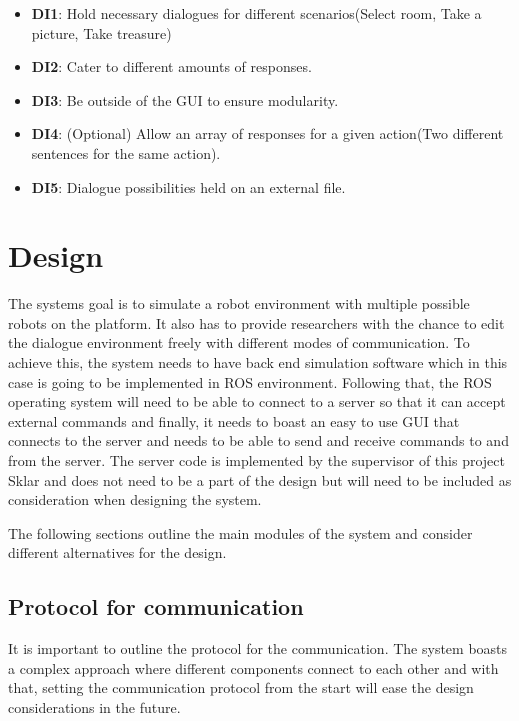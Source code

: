 \documentclass{report}
\begin{document}
        \begin{itemize}
          \item \textbf{DI1}: Hold necessary dialogues for different scenarios(Select room, Take a picture, Take treasure)
          \item \textbf{DI2}: Cater to different amounts of responses.
          \item \textbf{DI3}: Be outside of the GUI to ensure modularity.
          \item \textbf{DI4}: (Optional) Allow an array of responses for a given action(Two different sentences for the same action).
          \item \textbf{DI5}: Dialogue possibilities held on an external file.
        \end{itemize}

  \chapter{Design}

    The systems goal is to simulate a robot environment with multiple possible robots on the platform. It also has to provide researchers with the chance to edit the dialogue environment freely with different modes of communication. To achieve this, the system needs to have back end simulation software which in this case is going to be implemented in ROS environment. Following that, the ROS operating system will need to be able to connect to a server so that it can accept external commands and finally, it needs to boast an easy to use GUI that connects to the server and needs to be able to send and receive commands to and from the server. The server code is implemented by the supervisor of this project Sklar and does not need to be a part of the design but will need to be included as consideration when designing the system.

    The following sections outline the main modules of the system and consider different alternatives for the design.
    \section{Protocol for communication}
      It is important to outline the protocol for the communication. The system boasts a complex approach where different components connect to each other and with that, setting the communication protocol from the start will ease the design considerations in the future.
\end{document}
